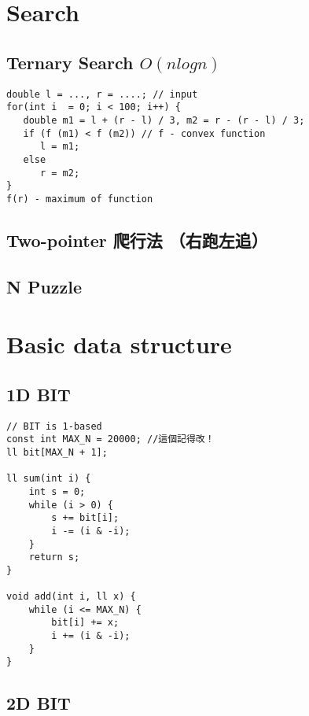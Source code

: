 \documentclass[10pt,oneside]{article}
\begin{document}
\begin{landscape}
\begin{multicols}{2}

\section{Search}

\subsection{Ternary Search $O(nlogn)$}

\begin{lstlisting}
double l = ..., r = ....; // input
for(int i  = 0; i < 100; i++) {
   double m1 = l + (r - l) / 3, m2 = r - (r - l) / 3;
   if (f (m1) < f (m2)) // f - convex function
      l = m1;
   else
      r = m2;
}
f(r) - maximum of function
\end{lstlisting}

\subsection{Two-pointer 爬行法 （右跑左追）}

\subsection{N Puzzle}



\section{Basic data structure}

\subsection{1D BIT}

\begin{lstlisting}
// BIT is 1-based
const int MAX_N = 20000; //這個記得改！
ll bit[MAX_N + 1];

ll sum(int i) {
    int s = 0;
    while (i > 0) {
        s += bit[i];
        i -= (i & -i);
    }
    return s;
}

void add(int i, ll x) {
    while (i <= MAX_N) {
        bit[i] += x;
        i += (i & -i);
    }
}
\end{lstlisting}

\subsection{2D BIT}


\end{multicols}
\end{landscape}
\end{document}

